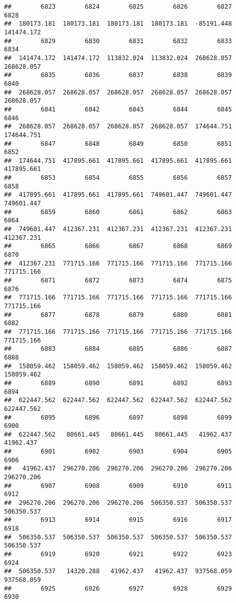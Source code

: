 \documentclass[
]{book}
\begin{document}
\begin{verbatim}
##        6823        6824        6825        6826        6827        6828 
##  180173.181  180173.181  180173.181  180173.181  -85191.448  141474.172 
##        6829        6830        6831        6832        6833        6834 
##  141474.172  141474.172  113832.024  113832.024  268628.057  268628.057 
##        6835        6836        6837        6838        6839        6840 
##  268628.057  268628.057  268628.057  268628.057  268628.057  268628.057 
##        6841        6842        6843        6844        6845        6846 
##  268628.057  268628.057  268628.057  268628.057  174644.751  174644.751 
##        6847        6848        6849        6850        6851        6852 
##  174644.751  417895.661  417895.661  417895.661  417895.661  417895.661 
##        6853        6854        6855        6856        6857        6858 
##  417895.661  417895.661  417895.661  749601.447  749601.447  749601.447 
##        6859        6860        6861        6862        6863        6864 
##  749601.447  412367.231  412367.231  412367.231  412367.231  412367.231 
##        6865        6866        6867        6868        6869        6870 
##  412367.231  771715.166  771715.166  771715.166  771715.166  771715.166 
##        6871        6872        6873        6874        6875        6876 
##  771715.166  771715.166  771715.166  771715.166  771715.166  771715.166 
##        6877        6878        6879        6880        6881        6882 
##  771715.166  771715.166  771715.166  771715.166  771715.166  771715.166 
##        6883        6884        6885        6886        6887        6888 
##  158059.462  158059.462  158059.462  158059.462  158059.462  158059.462 
##        6889        6890        6891        6892        6893        6894 
##  622447.562  622447.562  622447.562  622447.562  622447.562  622447.562 
##        6895        6896        6897        6898        6899        6900 
##  622447.562   80661.445   80661.445   80661.445   41962.437   41962.437 
##        6901        6902        6903        6904        6905        6906 
##   41962.437  296270.206  296270.206  296270.206  296270.206  296270.206 
##        6907        6908        6909        6910        6911        6912 
##  296270.206  296270.206  296270.206  506350.537  506350.537  506350.537 
##        6913        6914        6915        6916        6917        6918 
##  506350.537  506350.537  506350.537  506350.537  506350.537  506350.537 
##        6919        6920        6921        6922        6923        6924 
##  506350.537   14320.288   41962.437   41962.437  937568.059  937568.059 
##        6925        6926        6927        6928        6929        6930 

\end{verbatim}
\end{document}

